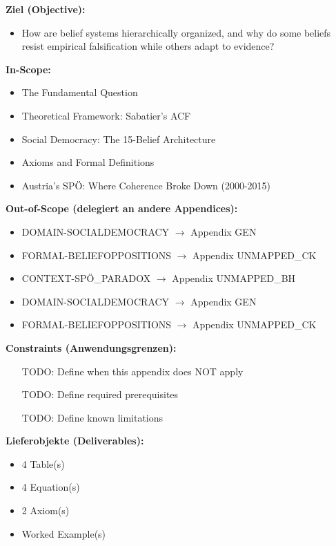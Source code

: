 \begin{tcolorbox}[
    colback=orange!5!white,
    colframe=orange!75!black,
    title={\textbf{Appendix Scope: Ziel / In-Scope / Out-of-Scope / Constraints}},
    fonttitle=\bfseries
]

\textbf{Ziel (Objective):}
\begin{itemize}[nosep]
    \item How are belief systems hierarchically organized, and why do some beliefs resist empirical falsification while others adapt to evidence?
\end{itemize}

\textbf{In-Scope:}
\begin{itemize}[nosep]
    \item The Fundamental Question
    \item Theoretical Framework: Sabatier's ACF
    \item Social Democracy: The 15-Belief Architecture
    \item Axioms and Formal Definitions
    \item Austria's SPÖ: Where Coherence Broke Down (2000-2015)
\end{itemize}

\textbf{Out-of-Scope (delegiert an andere Appendices):}
\begin{itemize}[nosep]
    \item DOMAIN-SOCIALDEMOCRACY $\rightarrow$ Appendix GEN
    \item FORMAL-BELIEFOPPOSITIONS $\rightarrow$ Appendix UNMAPPED_CK
    \item CONTEXT-SPÖ_PARADOX $\rightarrow$ Appendix UNMAPPED_BH
    \item DOMAIN-SOCIALDEMOCRACY $\rightarrow$ Appendix GEN
    \item FORMAL-BELIEFOPPOSITIONS $\rightarrow$ Appendix UNMAPPED_CK
\end{itemize}

\textbf{Constraints (Anwendungsgrenzen):}
\begin{itemize}[nosep]
    \item [TODO: Define when this appendix does NOT apply]
    \item [TODO: Define required prerequisites]
    \item [TODO: Define known limitations]
\end{itemize}

\textbf{Lieferobjekte (Deliverables):}
\begin{itemize}[nosep]
    \item 4 Table(s)
    \item 4 Equation(s)
    \item 2 Axiom(s)
    \item Worked Example(s)
\end{itemize}

\end{tcolorbox}


